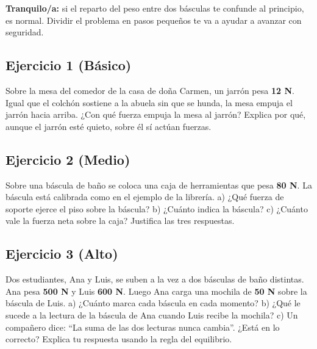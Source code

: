 \documentclass[
  spanish,
  letterpaper,
  12pt,
  oneside,
  open=any,
  DIV=15]{scrbook}
\begin{document}
\begin{tcolorbox}[enhanced jigsaw, arc=.35mm, bottomrule=.15mm, bottomtitle=1mm, breakable, colback=white, colbacktitle=quarto-callout-note-color!10!white, colframe=quarto-callout-note-color-frame, coltitle=black, left=2mm, leftrule=.75mm, opacityback=0, opacitybacktitle=0.6, rightrule=.15mm, title=\textcolor{quarto-callout-note-color}{\faInfo}\hspace{0.5em}{Apoyo Socioemocional}, titlerule=0mm, toprule=.15mm, toptitle=1mm]

\textbf{Tranquilo/a:} si el reparto del peso entre dos básculas te
confunde al principio, es normal. Dividir el problema en pasos pequeños
te va a ayudar a avanzar con seguridad.

\end{tcolorbox}

\subsection{Ejercicio 1 (Básico)}\label{ejercicio-1-buxe1sico-4}

Sobre la mesa del comedor de la casa de doña Carmen, un jarrón pesa
\textcolor[HTML]{2563EB}{\textbf{12 N}}. Igual que el colchón sostiene a
la abuela sin que se hunda, la mesa empuja el jarrón hacia arriba. ¿Con
qué fuerza empuja la mesa al jarrón? Explica por qué, aunque el jarrón
esté quieto, sobre él sí actúan fuerzas.

\subsection{Ejercicio 2 (Medio)}\label{ejercicio-2-medio-4}

Sobre una báscula de baño se coloca una caja de herramientas que pesa
\textcolor[HTML]{2563EB}{\textbf{80 N}}. La báscula está calibrada como
en el ejemplo de la librería. a) ¿Qué fuerza de soporte ejerce el piso
sobre la báscula? b) ¿Cuánto indica la báscula? c) ¿Cuánto vale la
fuerza neta sobre la caja? Justifica las tres respuestas.

\subsection{Ejercicio 3 (Alto)}\label{ejercicio-3-alto-3}

Dos estudiantes, Ana y Luis, se suben a la vez a dos básculas de baño
distintas. Ana pesa \textcolor[HTML]{2563EB}{\textbf{500 N}} y Luis
\textcolor[HTML]{2563EB}{\textbf{600 N}}. Luego Ana carga una mochila de
\textcolor[HTML]{2563EB}{\textbf{50 N}} sobre la báscula de Luis. a)
¿Cuánto marca cada báscula en cada momento? b) ¿Qué le sucede a la
lectura de la báscula de Ana cuando Luis recibe la mochila? c) Un
compañero dice: ``La suma de las dos lecturas nunca cambia''. ¿Está en
lo correcto? Explica tu respuesta usando la regla del equilibrio.
\end{document}
